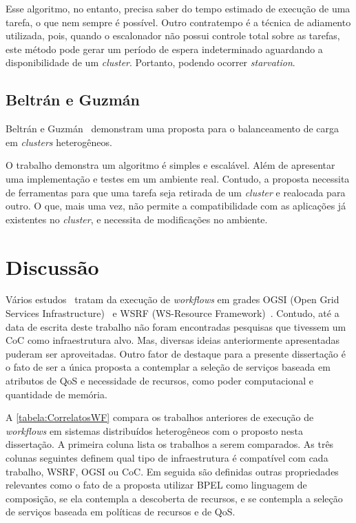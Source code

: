 \documentclass[12pt]{report} %
\begin{document}
	    Esse algoritmo, no entanto, precisa saber do tempo estimado de execução de uma tarefa, o que nem sempre é possível.
	    Outro contratempo é a técnica de adiamento utilizada, pois, quando o escalonador não possui controle total sobre as tarefas, este método pode gerar um período de espera indeterminado aguardando a disponibilidade de um \textit{cluster}.
	    Portanto, podendo ocorrer \textit{starvation}.


	\subsection{Beltrán e Guzmán}
	    Beltrán e Guzmán~\cite{Antonio09} demonstram uma proposta para o balanceamento de carga em \textit{clusters} heterogêneos.
	    
	    O trabalho demonstra um algoritmo é simples e escalável.
	    Além de apresentar uma implementação e testes em um ambiente real.
	    Contudo, a proposta necessita de ferramentas para que uma tarefa seja retirada de um \textit{cluster} e realocada para outro.
	    O que, mais uma vez, não permite a compatibilidade com as aplicações já existentes no \textit{cluster}, e necessita de modificações no ambiente.

    \section{Discussão}
	Vários estudos~\cite{GridServiceComposition08,Leymann06,GridEnabledWF08,Slomiski06,Tsalgatidou06} tratam da execução de \textit{workflows} em grades OGSI (Open Grid Services Infrastructure)~\cite{OGSI} e WSRF (WS-Resource Framework)~\cite{wsrf}.
	Contudo, até a data de escrita deste trabalho não foram encontradas pesquisas que tivessem um CoC como infraestrutura alvo.
	Mas, diversas ideias anteriormente apresentadas puderam ser aproveitadas.
	Outro fator de destaque para a presente dissertação é o fato de ser a única proposta a contemplar a seleção de serviços baseada em atributos de QoS e necessidade de recursos, como poder computacional e quantidade de memória.

	A \autoref{tabela:CorrelatosWF} compara os trabalhos anteriores de execução de \textit{workflows} em sistemas distribuídos heterogêneos com o proposto nesta dissertação.
	A primeira coluna lista os trabalhos a serem comparados.
	As três colunas seguintes definem qual tipo de infraestrutura é compatível com cada trabalho, WSRF, OGSI ou CoC.
	Em seguida são definidas outras propriedades relevantes como o fato de a proposta utilizar BPEL como linguagem de composição,
	se ela contempla a descoberta de recursos,
	e se contempla a seleção de serviços baseada em políticas de recursos e de QoS.
\end{document}
